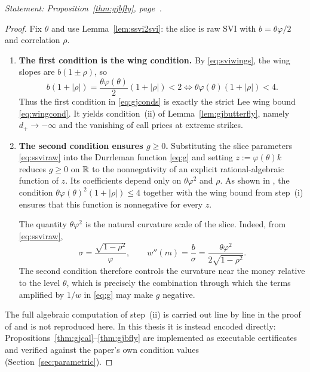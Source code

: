 \noindent\emph{Statement: Proposition~\ref{thm:gjbfly}, page~\pageref{thm:gjbfly}.}\medskip

\begin{proof}
Fix $\theta$ and use Lemma~\ref{lem:ssvi2svi}: the slice is raw SVI with
$b=\theta\varphi/2$ and correlation $\rho$.

\begin{enumerate}[label=\textup{(\roman*)}, leftmargin=*]

\item \textbf{The first condition is the wing condition.}
By \eqref{eq:sviwings}, the wing slopes are $b(1\pm\rho)$, so
\[
b(1+|\rho|)
=\frac{\theta\varphi(\theta)}{2}(1+|\rho|)<2
\iff
\theta\varphi(\theta)(1+|\rho|)<4.
\]
Thus the first condition in \eqref{eq:gjconds} is exactly the strict Lee wing bound
\eqref{eq:wingcond}. It yields condition~(ii) of Lemma~\ref{lem:gjbutterfly}, namely
$d_+\to-\infty$ and the vanishing of call prices at extreme strikes.

\item \textbf{The second condition ensures $g\ge0$.}
Substituting the slice parameters \eqref{eq:ssviraw} into the Durrleman function
\eqref{eq:g} and setting $z:=\varphi(\theta)k$ reduces $g\ge0$ on $\mathbb{R}$ to the
nonnegativity of an explicit rational-algebraic function of $z$. Its coefficients depend
only on $\theta\varphi^2$ and $\rho$. As shown in
\cite[Thm.~4.2]{gatheraljacquier2014}, the condition
$\theta\varphi(\theta)^2(1+|\rho|)\le4$ together with the wing bound from step~(i) ensures
that this function is nonnegative for every $z$.

The quantity $\theta\varphi^2$ is the natural curvature scale of the slice. Indeed,
from \eqref{eq:ssviraw},
\[
\sigma=\frac{\sqrt{1-\rho^2}}{\varphi},
\qquad
w''(m)=\frac{b}{\sigma}
=\frac{\theta\varphi^2}{2\sqrt{1-\rho^2}}.
\]
The second condition therefore controls the curvature near the money relative to the level
$\theta$, which is precisely the combination through which the terms amplified by $1/w$ in
\eqref{eq:g} may make $g$ negative.
\end{enumerate}

The full algebraic computation of step~(ii) is carried out line by line in the proof of
\cite[Thm.~4.2, pp.~14--15]{gatheraljacquier2014} and is not reproduced here. In this thesis it
is instead encoded directly: Propositions~\ref{thm:gjcal}--\ref{thm:gjbfly} are implemented as
executable certificates and verified against the paper's own condition values
(Section~\ref{sec:parametric}).
\end{proof}



